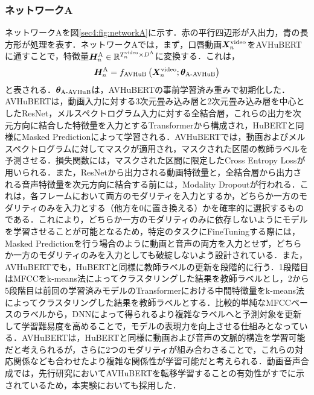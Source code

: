 \subsubsection{ネットワークA}
ネットワークAを図\ref{sec4:fig:networkA}に示す．赤の平行四辺形が入出力，青の長方形が処理を表す．ネットワークAでは，まず，口唇動画$\bm{X}^{\text{video}}_{n}$をAVHuBERTに通すことで，特徴量$\bm{H}^{\text{A}}_{n} \in \mathbb{R}^{T^{\text{video}}_{n} \times D^{\text{A}}}$に変換する．これは，
\begin{equation}
    \bm{H}^{\text{A}}_{n} = f_{\text{AVHuB}}\left(\bm{X}^{\text{video}}_{n}; \bm{\theta}_{\text{A-AVHuB}}\right)
\end{equation}
と表される．$\bm{\theta}_{\text{A-AVHuB}}$は，AVHuBERTの事前学習済み重みで初期化した．AVHuBERTは，動画入力に対する3次元畳み込み層と2次元畳み込み層を中心としたResNet，メルスペクトログラム入力に対する全結合層，これらの出力を次元方向に結合した特徴量を入力とするTransformerから構成され，HuBERTと同様にMasked Predictionによって学習される．AVHuBERTでは，動画およびメルスペクトログラムに対してマスクが適用され，マスクされた区間の教師ラベルを予測させる．損失関数には，マスクされた区間に限定したCross Entropy Lossが用いられる．また，ResNetから出力される動画特徴量と，全結合層から出力される音声特徴量を次元方向に結合する前には，Modality Dropoutが行われる．これは，各フレームにおいて両方のモダリティを入力とするか，どちらか一方のモダリティのみを入力とする（他方を0に置き換える）かを確率的に選択するものである．これにより，どちらか一方のモダリティのみに依存しないようにモデルを学習させることが可能となるため，特定のタスクにFineTuningする際には，Masked Predictionを行う場合のように動画と音声の両方を入力とせず，どちらか一方のモダリティのみを入力としても破綻しないよう設計されている．また，AVHuBERTでも，HuBERTと同様に教師ラベルの更新を段階的に行う．1段階目はMFCCをk-means法によってクラスタリングした結果を教師ラベルとし，2から5段階目は前回の学習済みモデルのTransformerにおける中間特徴量をk-means法によってクラスタリングした結果を教師ラベルとする．比較的単純なMFCCベースのラベルから，DNNによって得られるより複雑なラベルへと予測対象を更新して学習難易度を高めることで，モデルの表現力を向上させる仕組みとなっている．AVHuBERTは，HuBERTと同様に動画および音声の文脈的構造を学習可能だと考えられるが，さらに2つのモダリティが組み合わさることで，これらの対応関係なども合わせたより複雑な関係性が学習可能だと考えられる．動画音声合成では，先行研究においてAVHuBERTを転移学習することの有効性がすでに示されているため，本実験においても採用した．

